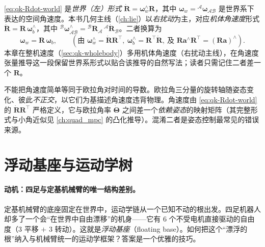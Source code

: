 \begin{note}\label{note:qk-omega-frame}
\cref{eq:qk-Rdot-world} 是\emph{世界（左）形式} $\dot{\mathbf{R}}=\boldsymbol{\omega}_w^{\wedge}\mathbf{R}$，其中 $\boldsymbol{\omega}_w={}^{\mathcal{A}}\boldsymbol{\omega}_{\mathcal{AB}}$ 是世界系下表达的空间角速度。本书几何主线（\cref{ch:lie}）以\emph{右扰动}为主，对应\emph{机体角速度}形式 $\dot{\mathbf{R}}=\mathbf{R}\,\boldsymbol{\omega}_b^{\wedge}$，其中 ${}^{\mathcal{B}}\boldsymbol{\omega}_{\mathcal{AB}}^{\wedge}={}^{\mathcal{B}}\mathbf{R}_{\mathcal{A}}\,{}^{\mathcal{A}}\dot{\mathbf{R}}_{\mathcal{B}}$\cite{yu2021quadruped}。二者换算为
\[
  \boldsymbol{\omega}_w=\mathbf{R}\,\boldsymbol{\omega}_b,
  \qquad(\text{由 }\boldsymbol{\omega}_w^{\wedge}=\dot{\mathbf{R}}\mathbf{R}^\top,\ \boldsymbol{\omega}_b^{\wedge}=\mathbf{R}^\top\dot{\mathbf{R}},\ \text{及 }\mathbf{R}\boldsymbol{a}^{\wedge}\mathbf{R}^\top=(\mathbf{R}\boldsymbol{a})^{\wedge}).
\]
本章在整机速度（\cref{sec:qk-wholebody}）多用机体角速度（右扰动主线），在角速度张量推导这一段保留世界系形式以贴合该推导的自然写法；读者只需记住二者差一个 $\mathbf{R}$。
\end{note}

\begin{pitfall}[误区：把角速度当成欧拉角的导数 $\boldsymbol{\omega}=\dot{\boldsymbol{\Theta}}$]
不能把角速度简单等同于欧拉角对时间的导数。欧拉角三分量的旋转轴随姿态变化、彼此\emph{不正交}，以它们为基描述角速度违背物理。角速度由 \cref{eq:qk-Rdot-world} 的 $\dot{\mathbf{R}}\mathbf{R}^\top$ 严格定义，它与欧拉角率 $\dot{\boldsymbol{\Theta}}$ 之间差一个\emph{依赖姿态}的映射矩阵（其完整形式与小角近似见 \cref{ch:quad_mpc} 的凸化推导）。混淆二者是姿态控制最常见的错误来源。
\end{pitfall}

\section{浮动基座与运动学树}
\label{sec:qk-floating}

\paragraph{动机：四足与定基机械臂的唯一结构差别。}
定基机械臂的底座固定在世界中，运动学链从一个已知不动的根出发。四足机器人却多了一个会“在世界中自由漂移”的机身——它有 $6$ 个不受电机直接驱动的自由度（$3$ 平移 $+$ $3$ 转动）。这就是\emph{浮动基座}（floating base）。如何把这个“漂浮的根”纳入与机械臂统一的运动学框架？答案是一个优雅的技巧。

